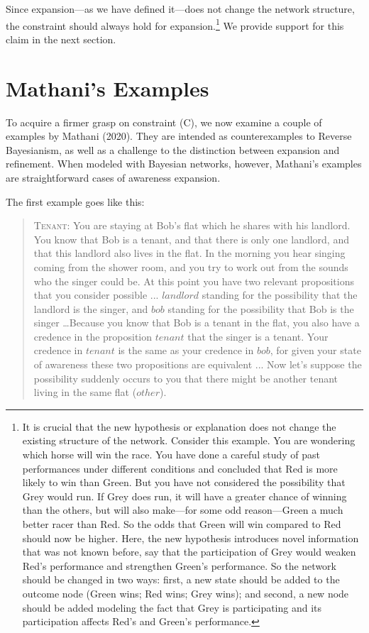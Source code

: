\documentclass[
  11pt,
  dvipsnames,enabledeprecatedfontcommands]{scrartcl}
\begin{document}
\noindent Since expansion---as we have defined it---does not change the
network structure, the constraint should always hold for
expansion.\footnote{It is crucial that the new hypothesis or explanation
  does not change the existing structure of the network. Consider this
  example. You are wondering which horse will win the race. You have
  done a careful study of past performances under different conditions
  and concluded that Red is more likely to win than Green. But you have
  not considered the possibility that Grey would run. If Grey does run,
  it will have a greater chance of winning than the others, but will
  also make---for some odd reason---Green a much better racer than Red.
  So the odds that Green will win compared to Red should now be higher.
  Here, the new hypothesis introduces novel information that was not
  known before, say that the participation of Grey would weaken Red's
  performance and strengthen Green's performance. So the network should
  be changed in two ways: first, a new state should be added to the
  outcome node (Green wins; Red wins; Grey wins); and second, a new node
  should be added modeling the fact that Grey is participating and its
  participation affects Red's and Green's performance.} We provide
support for this claim in the next section.

\hypertarget{mathanis-examples}{%
\section{Mathani's Examples}\label{mathanis-examples}}

\label{sec:mathani}

To acquire a firmer grasp on constraint (C), we now examine a couple of
examples by Mathani (2020). They are intended as counterexamples to
Reverse Bayesianism, as well as a challenge to the distinction between
expansion and refinement. When modeled with Bayesian networks, however,
Mathani's examples are straightforward cases of awareness expansion.

The first example goes like this:

\begin{quote}
\textsc{Tenant}: You are staying at Bob's flat which he shares with his landlord. You know that Bob is a tenant, and that there is only one landlord, and that this landlord also lives in the flat. In the morning you hear singing coming from the shower room, and you try to work out from the sounds who the singer could be. At this point you have two relevant propositions that you consider possible ... $landlord$ standing for the possibility that the landlord is the singer, and $bob$ standing for the possibility that Bob is the singer  \dots  Because you know that Bob is a tenant in the flat, you also have a credence in the proposition $tenant$ that the singer is a tenant. Your credence in $tenant$ is the same as your credence in $bob$, for given your state of awareness these two propositions are equivalent ... Now let's suppose the possibility suddenly occurs to you that there might be another tenant living in the same flat  ($other$).
\end{quote}
\end{document}
